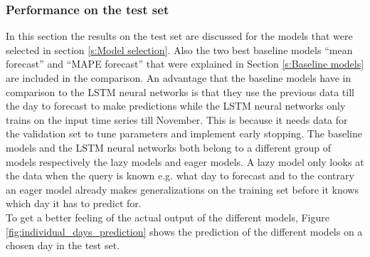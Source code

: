 \subsubsection{Performance on the test set}
In this section the results on the test set are discussed for the models that were selected in section \ref{s:Model selection}. 
Also the two best baseline models ``mean forecast'' and ``MAPE forecast'' that were explained in Section \ref{s:Baseline models} are included in the comparison. An advantage that the baseline models have in comparison to the LSTM neural networks is that they use the previous data till the day to forecast to make predictions while the LSTM neural networks only trains on the input time series till November. This is because it needs data for the validation set to tune parameters and implement early stopping. The baseline models and the LSTM neural networks both belong to a different group of models respectively the lazy models and eager models. A lazy model only looks at the data when the query is known e.g. what day to forecast and to the contrary an eager model already makes generalizations on the training set before it knows which day it has to predict for.\\








To get a better feeling of the actual output of the different models, Figure \ref{fig:individual_days_prediction} shows the prediction of the different models on a chosen day in the test set.
 
